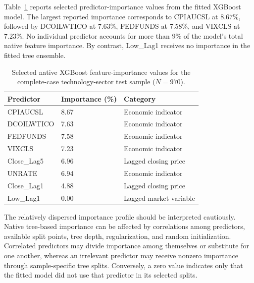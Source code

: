 \documentclass[utf8]{FrontiersinHarvard} %
\begin{document}
Table~\ref{tab:technology_xgb_importance} reports selected predictor-importance values from the fitted XGBoost model. The largest reported importance corresponds to CPIAUCSL at \(8.67\%\), followed by DCOILWTICO at \(7.63\%\), FEDFUNDS at \(7.58\%\), and VIXCLS at \(7.23\%\). No individual predictor accounts for more than \(9\%\) of the model's total native feature importance. By contrast, Low\_Lag1 receives no importance in the fitted tree ensemble.

\begin{table}[h]
	\caption{Selected native XGBoost feature-importance values for the complete-case technology-sector test sample (\(N=970\)).}
	\label{tab:technology_xgb_importance}
	\setlength{\tabcolsep}{3pt}
	\centering
	\begin{tabular}{p{105pt}p{95pt}p{125pt}}
		\hline
		\textbf{Predictor} &
		\textbf{Importance (\%)} &
		\textbf{Category} \\
		\hline
		
		CPIAUCSL &
		8.67 &
		Economic indicator \\
		
		DCOILWTICO &
		7.63 &
		Economic indicator \\
		
		FEDFUNDS &
		7.58 &
		Economic indicator \\
		
		VIXCLS &
		7.23 &
		Economic indicator \\
		
		Close\_Lag5 &
		6.96 &
		Lagged closing price \\
		
		UNRATE &
		6.94 &
		Economic indicator \\
		
		Close\_Lag1 &
		4.88 &
		Lagged closing price \\
		
		Low\_Lag1 &
		0.00 &
		Lagged market variable \\
		\hline
		
	\end{tabular}
	\footnotesize
\end{table}

The relatively dispersed importance profile should be interpreted cautiously. Native tree-based importance can be affected by correlations among predictors, available split points, tree depth, regularization, and random initialization. Correlated predictors may divide importance among themselves or substitute for one another, whereas an irrelevant predictor may receive nonzero importance through sample-specific tree splits. Conversely, a zero value indicates only that the fitted model did not use that predictor in its selected splits.
\end{document}
